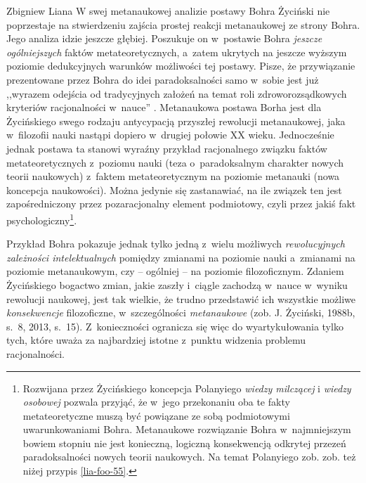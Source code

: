 \begin{artplenv}{Zbigniew Liana}
W swej metanaukowej analizie postawy Bohra Życiński nie poprzestaje na stwierdzeniu zajścia prostej reakcji metanaukowej
ze strony Bohra. Jego analiza idzie jeszcze głębiej. Poszukuje on w~postawie Bohra \textit{jeszcze} \textit{ogólniejszych
}faktów metateoretycznych, a~zatem ukrytych na jeszcze wyższym poziomie dedukcyjnych warunków możliwości tej postawy.
Pisze, że przywiązanie prezentowane przez Bohra do idei paradoksalności samo w~sobie jest już ,,wyrazem odejścia od
tradycyjnych założeń na temat roli zdroworozsądkowych kryteriów racjonalności w~nauce''
\parencites[s.~9]{zycinski_structure_1988}[s.~16]{zycinski_struktura_2013}.
Metanaukowa postawa Borha jest dla Życińskiego swego rodzaju antycypacją przyszłej
rewolucji metanaukowej, jaka w~filozofii nauki nastąpi dopiero w~drugiej połowie XX wieku. Jednocześnie jednak postawa
ta stanowi wyraźny przykład racjonalnego związku faktów metateoretycznych z~poziomu nauki (teza o~paradoksalnym
charakter nowych teorii naukowych) z~faktem metateoretycznym na poziomie metanauki (nowa koncepcja naukowości). Można
jedynie się zastanawiać, na ile związek ten jest zapośredniczony przez pozaracjonalny element podmiotowy, czyli przez
jakiś fakt psychologiczny\footnote{\label{lia-foo-26}Rozwijana przez Życińskiego koncepcja Polanyiego \textit{wiedzy milczącej} i
\textit{wiedzy osobowej }pozwala przyjąć, że w~jego przekonaniu oba te fakty metateoretyczne muszą być powiązane ze sobą
podmiotowymi uwarunkowaniami Bohra. Metanaukowe rozwiązanie Bohra w~najmniejszym bowiem stopniu nie jest konieczną,
logiczną konsekwencją odkrytej przezeń paradoksalności nowych teorii naukowych. Na temat Polanyiego zob.
\parencites[s.~169n]{zycinski_jezyk_1983}[s.~156–166]{zycinski_teizm_1985}[s.~144.202]{zycinski_structure_1988}%
[s.~218.351]{zycinski_struktura_2013}[s.~179–191]{zycinski_elementy_2015}
zob. też niżej przypis \ref{lia-foo-55}.}.

Przykład Bohra pokazuje jednak tylko jedną z~wielu możliwych \textit{rewolucyjnych zależności intelektualnych} pomiędzy
zmianami na poziomie nauki a~zmianami na poziomie metanaukowym, czy -- ogólniej -- na poziomie filozoficznym. Zdaniem
Życińskiego bogactwo zmian, jakie zaszły i~ciągle zachodzą w~nauce w~wyniku rewolucji naukowej, jest tak wielkie, że
trudno przedstawić ich wszystkie możliwe \textit{konsekwencje} filozoficzne, w~szczególności \textit{metanaukowe}
\label{ref:RNDJXAyHhUuS3}(zob. J. Życiński, 1988b, s.~8, 2013, s.~15). Z~konieczności ogranicza się więc do
wyartykułowania tylko tych, które uważa za najbardziej istotne z~punktu widzenia problemu racjonalności.


\end{artplenv}

